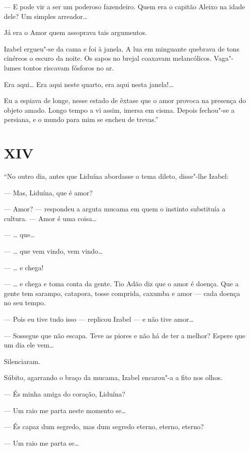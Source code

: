 --- E pode vir a ser um poderoso fazendeiro. Quem era o capitão Aleixo
na idade dele? Um simples arreador\ldots{}

Já era o Amor quem assoprava tais argumentos.

Izabel ergueu"-se da cama e foi à janela. A lua em minguante quebrava de
tons cinéreos o escuro da noite. Os sapos no brejal coaxavam
melancólicos. Vaga"-lumes tontos riscavam fósforos no ar.

Era aqui\ldots{} Era aqui neste quarto, era aqui nesta janela!\ldots{}

Eu a espiava de longe, nesse estado de êxtase que o amor provoca na
presença do objeto amado. Longo tempo a vi assim, imersa em cisma.
Depois fechou"-se a persiana, e o mundo para mim se encheu de trevas.''

\section*{XIV}

``No outro dia, antes que Liduína abordasse o tema dileto, disse"-lhe
Izabel:

--- Mas, Liduína, que é amor?

--- Amor? --- respondeu a arguta mucama em quem o instinto substituía a
cultura. --- Amor é uma coisa\ldots{}

--- \ldots{} que\ldots{}

--- \ldots{} que vem vindo, vem vindo\ldots{}

--- \ldots{} e chega!

--- \ldots{} e chega e toma conta da gente. Tio Adão diz que o amor é doença.
Que a gente tem sarampo, catapora, tosse comprida, caxumba e amor ---
cada doença no seu tempo.

--- Pois eu tive tudo isso --- replicou Izabel --- e não tive amor\ldots{}

--- Sossegue que não escapa. Teve as piores e não há de ter a melhor?
Espere que um dia ele vem\ldots{}

Silenciaram.

Súbito, agarrando o braço da mucama, Izabel encarou"-a a fito nos olhos.

--- És minha amiga do coração, Liduína?

--- Um raio me parta neste momento se\ldots{}

--- És capaz dum segredo, mas dum segredo eterno, eterno, eterno?

--- Um raio me parta se\ldots{}


